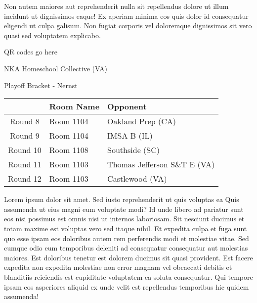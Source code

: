 \documentclass{article}%
\begin{document}
\newline%
Non autem maiores aut reprehenderit nulla sit repellendus dolore ut illum incidunt ut dignissimos eaque! Ex aperiam minima eos quis dolor id consequatur eligendi ut culpa galisum. Non fugiat corporis vel doloremque dignissimos sit vero quasi sed voluptatem explicabo.\newline%
\newline%
%
\vspace*{30pt}%
\begin{center}%
\begin{Huge}%
QR codes go here%
\end{Huge}%
\end{center}%
\newpage%
\begin{center}%
\begin{Huge}%
NKA Homeschool Collective (VA)%
\end{Huge}%
\vspace*{8pt}%
\linebreak%
\begin{Large}%
Playoff Bracket {-} Nernst%
\end{Large}%
\end{center}%
\begin{tabularx}{\textwidth}{|c|Y|Y|}%
\hline%
&Room Name&Opponent\\%
\hline%
Round 8&Room 1104&Oakland Prep (CA)\\%
Round 9&Room 1104&IMSA B (IL)\\%
Round 10&Room 1108&Southside (SC)\\%
Round 11&Room 1103&Thomas Jefferson S\&T E (VA)\\%
Round 12&Room 1103&Castlewood (VA)\\%
\hline%
\end{tabularx}%
\vspace*{8pt}%
\linebreak%
\newline%
\newline%
Lorem ipsum dolor sit amet. Sed iusto reprehenderit ut quis voluptas ea Quis assumenda ut eius magni eum voluptate modi? Id unde libero ad pariatur sunt eos nisi possimus est omnis nisi ut internos laboriosam. Sit nesciunt ducimus et totam maxime est voluptas vero sed itaque nihil. Et expedita culpa et fuga sunt quo esse ipsam eos doloribus autem rem perferendis modi et molestiae vitae.\newline%
\newline%
Sed cumque odio eum temporibus deleniti ad consequatur consequatur aut molestias maiores. Est doloribus tenetur est dolorem ducimus sit quasi provident. Est facere expedita non expedita molestiae non error magnam vel obcaecati debitis et blanditiis reiciendis est cupiditate voluptatem ea soluta consequatur. Qui tempore ipsam eos asperiores aliquid ex unde velit est repellendus temporibus hic quidem assumenda!\newline%
\end{document}
